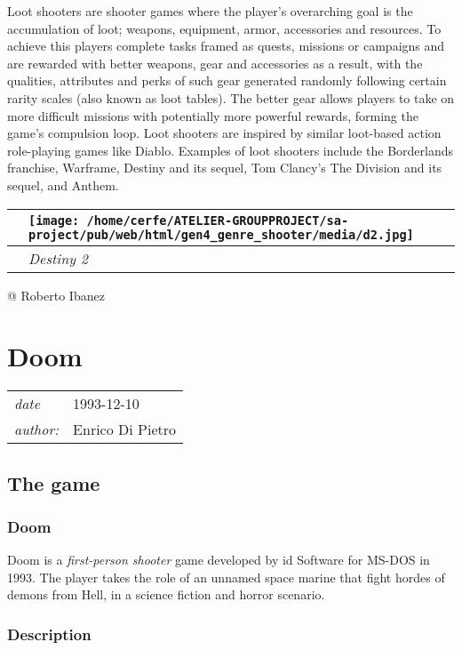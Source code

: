 \documentclass[a4paper,10pt]{book}
\newcommand{\pageHeader}[4]{
    \section{#1}
    \vspace{-0.3cm}
    \begin{table}[h!]
     \begin{tabular}{ll}
        \hline
        \textit{date} & #2 \\
        \textit{author: } & #3\\
        \hline
     \end{tabular}
    \end{table}
    \vspace{-0.3cm}
}
\begin{document}
            Loot shooters are shooter games where the player's overarching goal is the accumulation of loot; weapons, equipment, armor, accessories and resources. 
            To achieve this players complete tasks framed as quests, missions or campaigns and are rewarded with better weapons, gear and accessories as a result, with the qualities, attributes and perks of such gear generated randomly following certain rarity scales (also known as loot tables). 
            The better gear allows players to take on more difficult missions with potentially more powerful rewards, forming the game's compulsion loop. 
            Loot shooters are inspired by similar loot-based action role-playing games like Diablo.  
            Examples of loot shooters include the Borderlands franchise, Warframe, Destiny and its sequel, Tom Clancy's The Division and its sequel, and Anthem.
           
 \begin{longtable}{p{1mm}|l|}\hline
 
 & \texttt{[image: /home/cerfe/ATELIER-GROUPPROJECT/sa-project/pub/web/html/gen4\_genre\_shooter/media/d2.jpg]}
 \\\hline
 
 & \textit{Destiny 2 }
 \\\hline
 \end{longtable}
 
 @ Roberto Ibanez 
 
 \newpage\pageHeader{Doom}{1993-12-10}{Enrico Di Pietro}{Times change. Doom is eternal.}
 \subsection{The game }
 
 \subsubsection{Doom }
 
          Doom is a  \textit{first-person shooter } game developed by id Software for MS-DOS in
          1993. The player takes the role of an unnamed space marine that fight hordes
          of demons from Hell, in a science fiction and horror scenario.
         
 
 \subsubsection{Description }
 
\end{document}
